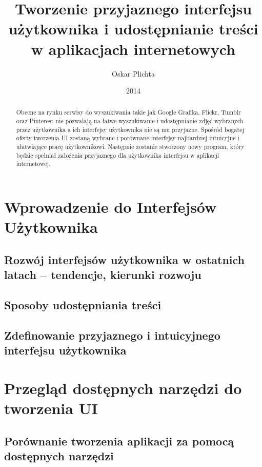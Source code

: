 \documentclass[brudnopis]{xmgr}
\author   {Oskar Plichta}
\title    {Tworzenie przyjaznego interfejsu użytkownika i udostępnianie treści w aplikacjach internetowych}
\date     {2014}
\begin{document}
\begin{abstract}
 Obecne na rynku serwisy do wyszukiwania takie jak Google Grafika, Flickr, Tumblr oraz Pinterest nie pozwalają na łatwe wyszukiwanie i udostępnianie zdjęć wybranych przez użytkownika a ich interfejsy użytkownika nie są mu przyjazne. Spośród bogatej oferty tworzenia UI zostaną wybrane i porównane interfejsy najbardziej intuicyjne i ułatwiające pracę użytkownikowi. Następnie zostanie stworzony nowy program, który będzie spełniał założenia przyjaznego dla użytkownika interfejsu w aplikacji internetowej.
\end{abstract}

\maketitle
%
\introduction

\chapter{Wprowadzenie do Interfejsów Użytkownika}

\section{Rozwój interfejsów użytkownika w ostatnich latach – tendencje, kierunki rozwoju}

\section{Sposoby udostępniania treści\label{s:dtd}}

\section{Zdefinowanie przyjaznego i intuicyjnego interfejsu użytkownika}

\chapter{Przegląd dostępnych narzędzi do tworzenia UI }

\section{ Porównanie tworzenia aplikacji za pomocą dostępnych narzędzi\label{s:dsssl}}
\end{document}
